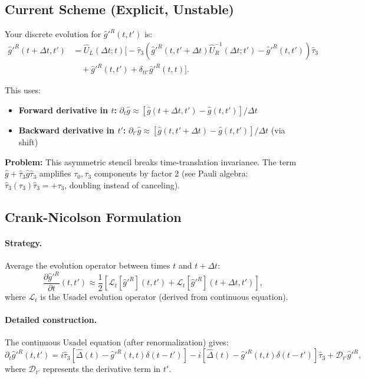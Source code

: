 \documentclass[11pt]{article}
\begin{document}
\subsection{Current Scheme (Explicit, Unstable)}

Your discrete evolution for $\hat{g}'^R(t,t')$ is:
\begin{equation}
\label{eq:current_explicit}
\begin{split}
\hat{g}'^R(t+\Delta t, t') &= \hat{U}_L(\Delta t; t) \Bigg[-\hat{\tau}_3 \left(\hat{g}'^R(t, t'+\Delta t) \hat{U}_R^{-1}(\Delta t; t') - \hat{g}'^R(t, t')\right) \hat{\tau}_3 \\
&\quad + \hat{g}'^R(t, t') + \delta_{tt'} \hat{g}'^R(t,t)\Bigg].
\end{split}
\end{equation}

This uses:
\begin{itemize}
\item \textbf{Forward derivative in $t$:} $\partial_t \hat{g} \approx [\hat{g}(t+\Delta t, t') - \hat{g}(t,t')]/\Delta t$
\item \textbf{Backward derivative in $t'$:} $\partial_{t'} \hat{g} \approx [\hat{g}(t, t'+\Delta t) - \hat{g}(t,t')]/\Delta t$ (via shift)
\end{itemize}

\textbf{Problem:} This asymmetric stencil breaks time-translation invariance. The term $\hat{g} + \hat{\tau}_3 \hat{g} \hat{\tau}_3$ amplifies $\tau_0, \tau_3$ components by factor 2 (see Pauli algebra: $\hat{\tau}_3 (\tau_3) \hat{\tau}_3 = +\tau_3$, doubling instead of canceling).

\subsection{Crank-Nicolson Formulation}

\paragraph{Strategy.}
Average the evolution operator between times $t$ and $t+\Delta t$:
\begin{equation}
\frac{\partial \hat{g}'^R}{\partial t}(t,t') \approx \frac{1}{2} \left[ \mathcal{L}_t[\hat{g}'^R](t,t') + \mathcal{L}_t[\hat{g}'^R](t+\Delta t,t') \right],
\end{equation}
where $\mathcal{L}_t$ is the Usadel evolution operator (derived from continuous equation).

\paragraph{Detailed construction.}
The continuous Usadel equation (after renormalization) gives:
\begin{equation}
\partial_t \hat{g}'^R(t,t') = i\hat{\tau}_3 [\hat{\Delta}(t) - \hat{g}'^R(t,t) \delta(t-t')] - i[\hat{\Delta}(t) - \hat{g}'^R(t,t) \delta(t-t')] \hat{\tau}_3 + \mathcal{D}_{t'} \hat{g}'^R,
\end{equation}
where $\mathcal{D}_{t'}$ represents the derivative term in $t'$.
\end{document}
